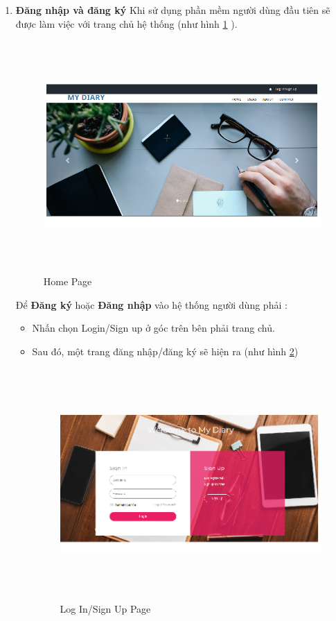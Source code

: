 \documentclass[a4paper]{article}
\begin{document}
	\begin{enumerate}
		\item \textbf{Đăng nhập và đăng ký}
		Khi sử dụng phần mềm người dùng đầu tiên sẽ được làm việc với trang chủ hệ thống (như hình \ref{mainbook16} ).

		\begin{figure}[!h]
	 			\centering
      			\includegraphics[height=250pt,width=340pt]{Images/h8.png}
	 		 	\caption{Home Page}
	 		 	\label{mainbook16}
	  		\end{figure}

		Để \textbf{Đăng ký} hoặc \textbf{Đăng nhập} vào hệ thống người dùng phải :


			\begin{itemize}
				\item Nhấn chọn Login/Sign up ở góc trên bên phải trang chủ.
				\item Sau đó, một trang đăng nhập/đăng ký sẽ hiện ra (như hình \ref{mainbook17})

				\begin{figure}[!h]
	 			\centering
      			\includegraphics[height=250pt,width=340pt]{Images/h11.png}
	 		 	\caption{Log In/Sign Up Page}
	 		 	\label{mainbook17}
	  		\end{figure}


\end{itemize}
\end{enumerate}
\end{document}
